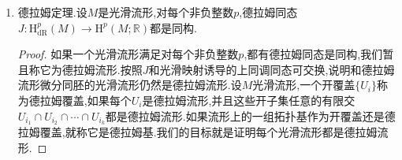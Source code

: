 \begin{enumerate}
\begin{proof}
    	第一个图表是容易的,任取$M$上的光滑奇异$p$单形$\sigma$,任取$N$上的$p$形式$\omega$,那么有:
    	$$\int_{\sigma}F^*\omega=\int_{\Delta_p}\sigma^*F^*\omega=\int_{\Delta_p}(F\circ\sigma)^*\omega=\int_{F\circ\sigma}\omega$$
    	
    	于是得到:
    	$$J(F^*[\omega])[\sigma]=J[\omega][F\circ\sigma]=J[\omega](F_*[\sigma])=F^*(J[\omega])[\sigma]$$
    	
    	第二个图表.任取$[\omega]\in\mathrm{H}_{\mathrm{dR}}^{p-1}(U\cap V)$,任取$[e]\in\mathrm{H}_p(M)$,那么我们要证的交换图表为$J(\delta[\omega])[e]=J[\omega](\partial_*[e])$.设$\sigma$是落在同调类$\delta[\omega]$中的光滑$p$形式,设$c$是落在同调类$\partial_*[e]$中的光滑$p-1$链.那么我们要证的等式为$\int_e\sigma=\int_c\omega$.
    	
    	按照奇异同调MV序列连接映射的描述,可记$c=\partial f$,其中$c$在$U,V$上的限制分别是$\partial f=-\partial f'$,其中$f,f'$分别是$U,V$上的$p$链,并且$f+f'$和$e$落在相同的同调类中.再按照德拉姆上同调的MV序列连接映射的描述,存在$\eta\in\Omega^{p-1}(U)$和$\eta'\in\Omega^{p-1}(V)$,使得$\omega=\eta\mid U\cap V-\eta'\mid U\cap V$,那么$U$上的$\mathrm{d}\eta$和$V$上的$\mathrm{d}\eta'$可粘合为$M$上的整体$p$形式$\sigma$.
    	
    	于是按照$\partial f+\partial f'=\partial e=0$和$\mathrm{d}\eta\mid U\cap V-\mathrm{d}\eta'\mid U\cap V=\mathrm{d}\omega=0$,得到:
    	\begin{align*}
    	\int_c\omega&=\int_{\partial f}\omega=\int_{\partial f}\eta-\int_{\partial f}\eta'=\int_{\partial f}\eta+\int_{\partial f'}\eta'\\&=\int_f\mathrm{d}\eta+\int_{f'}\mathrm{d}\eta'=\int_f\sigma+\int_{f'}\sigma=\int_e\sigma
    	\end{align*}
    \end{proof}
    \item 德拉姆定理.设$M$是光滑流形,对每个非负整数$p$,德拉姆同态$J:\mathrm{H}^p_{\mathrm{dR}}(M)\to\mathrm{H}^p(M;\mathbb{R})$都是同构.
    \begin{proof}
    	
    	如果一个光滑流形满足对每个非负整数$p$,都有德拉姆同态是同构,我们暂且称它为德拉姆流形.按照$J$和光滑映射诱导的上同调同态可交换,说明和德拉姆流形微分同胚的光滑流形仍然是德拉姆流形.设$M$光滑流形,一个开覆盖$\{U_i\}$称为德拉姆覆盖,如果每个$U_i$是德拉姆流形,并且这些开子集任意的有限交$U_{i_1}\cap U_{i_2}\cap\cdots\cap U_{i_k}$都是德拉姆流形.如果流形上的一组拓扑基作为开覆盖还是德拉姆覆盖,就称它是德拉姆基.我们的目标就是证明每个光滑流形都是德拉姆流形.
    	

\end{proof}
\end{enumerate}
